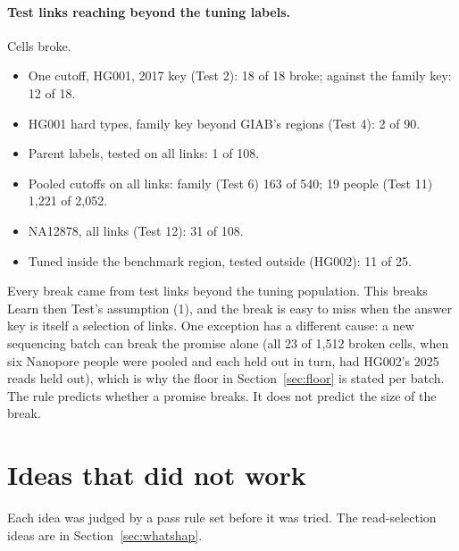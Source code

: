 \documentclass[11pt]{article}
\begin{document}
\paragraph{Test links reaching beyond the tuning labels.} Cells broke.
\begin{itemize}
\item One cutoff, HG001, 2017 key (Test 2): 18 of 18 broke; against the
  family key: 12 of 18.
\item HG001 hard types, family key beyond GIAB's regions (Test 4): 2 of 90.
\item Parent labels, tested on all links: 1 of 108.
\item Pooled cutoffs on all links: family (Test 6) 163 of 540; 19 people
  (Test 11) 1{,}221 of 2{,}052.
\item NA12878, all links (Test 12): 31 of 108.
\item Tuned inside the benchmark region, tested outside (HG002): 11 of 25.
\end{itemize}

Every break came from test links beyond the tuning population. This
breaks Learn then Test's assumption (1), and the break is easy to miss when
the answer key is itself a selection of links. One exception has a different
cause: a new sequencing batch can break
the promise alone (all 23 of 1{,}512 broken cells, when six Nanopore people
were pooled and each held out in turn, had HG002's 2025 reads held out),
which is why the floor in Section~\ref{sec:floor} is stated per batch. The
rule predicts whether a promise breaks. It does not predict the size of the
break.

\section{Ideas that did not work}\label{sec:honest}

Each idea was judged by a pass rule set before it was tried. The
read-selection ideas are in Section~\ref{sec:whatshap}.
\end{document}
